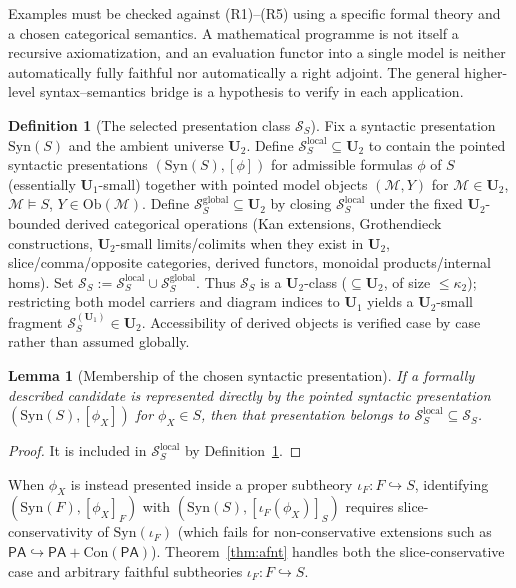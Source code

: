 \documentclass[11pt]{article}
\theoremstyle{plain}
\newtheorem{lemma}[theorem]{Lemma}
\theoremstyle{definition}
\newtheorem{definition}[theorem]{Definition}
\newcommand{\cS}{\mathcal{S}}
\newcommand{\cM}{\mathcal{M}}
\newcommand{\Ob}{\mathrm{Ob}}
\newcommand{\Syn}{\mathrm{Syn}}
\newcommand{\Con}{\mathrm{Con}}
\newcommand{\PA}{\mathsf{PA}}
\begin{document}
Examples must be checked against (R1)--(R5) using a specific formal theory and a chosen categorical semantics. A mathematical programme is not itself a recursive axiomatization, and an evaluation functor into a single model is neither automatically fully faithful nor automatically a right adjoint. The general higher-level syntax--semantics bridge is a hypothesis to verify in each application.

\begin{definition}[The selected presentation class $\cS_S$]\label{def:SS}
Fix a syntactic presentation $\Syn(S)$ and the ambient universe $\mathbf{U}_2$. Define $\cS_S^{\mathrm{local}} \subseteq \mathbf{U}_2$ to contain the pointed syntactic presentations $(\Syn(S), [\phi])$ for admissible formulas $\phi$ of $S$ (essentially $\mathbf{U}_1$-small) together with pointed model objects $(\cM, Y)$ for $\cM \in \mathbf{U}_2$, $\cM \models S$, $Y \in \Ob(\cM)$. Define $\cS_S^{\mathrm{global}} \subseteq \mathbf{U}_2$ by closing $\cS_S^{\mathrm{local}}$ under the fixed $\mathbf{U}_2$-bounded derived categorical operations (Kan extensions, Grothendieck constructions, $\mathbf{U}_2$-small limits/colimits when they exist in $\mathbf{U}_2$, slice/comma/opposite categories, derived functors, monoidal products/internal homs). Set $\cS_S := \cS_S^{\mathrm{local}} \cup \cS_S^{\mathrm{global}}$. Thus $\cS_S$ is a $\mathbf{U}_2$-class ($\subseteq \mathbf{U}_2$, of size $\le \kappa_2$); restricting both model carriers and diagram indices to $\mathbf{U}_1$ yields a $\mathbf{U}_2$-small fragment $\cS_S^{(\mathbf{U}_1)} \in \mathbf{U}_2$. Accessibility of derived objects is verified case by case rather than assumed globally.
\end{definition}

\begin{lemma}[Membership of the chosen syntactic presentation]\label{lem:SS-membership}
If a formally described candidate is represented directly by the pointed syntactic presentation $(\Syn(S), [\phi_X])$ for $\phi_X \in S$, then that presentation belongs to $\cS_S^{\mathrm{local}} \subseteq \cS_S$.
\end{lemma}
\begin{proof}
It is included in $\cS_S^{\mathrm{local}}$ by Definition~\ref{def:SS}.
\end{proof}
When $\phi_X$ is instead presented inside a proper subtheory $\iota_F : F \hookrightarrow S$, identifying $(\Syn(F), [\phi_X]_F)$ with $(\Syn(S), [\iota_F(\phi_X)]_S)$ requires slice-conservativity of $\Syn(\iota_F)$ (which fails for non-conservative extensions such as $\PA \hookrightarrow \PA + \Con(\PA)$). Theorem~\ref{thm:afnt} handles both the slice-conservative case and arbitrary faithful subtheories $\iota_F : F \hookrightarrow S$.
\end{document}

